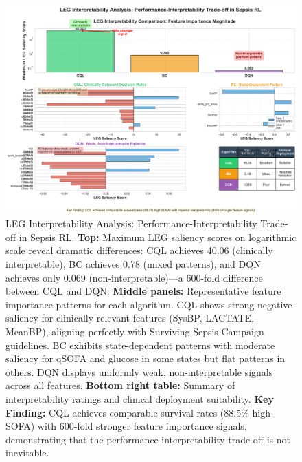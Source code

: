 \begin{figure}[htbp]
\centering
\includegraphics[width=\textwidth]{../results/figures/leg_interpretability_comparison.png}
\caption{LEG Interpretability Analysis: Performance-Interpretability Trade-off in Sepsis RL. \textbf{Top:} Maximum LEG saliency scores on logarithmic scale reveal dramatic differences: CQL achieves 40.06 (clinically interpretable), BC achieves 0.78 (mixed patterns), and DQN achieves only 0.069 (non-interpretable)—a 600-fold difference between CQL and DQN. \textbf{Middle panels:} Representative feature importance patterns for each algorithm. CQL shows strong negative saliency for clinically relevant features (SysBP, LACTATE, MeanBP), aligning perfectly with Surviving Sepsis Campaign guidelines. BC exhibits state-dependent patterns with moderate saliency for qSOFA and glucose in some states but flat patterns in others. DQN displays uniformly weak, non-interpretable signals across all features. \textbf{Bottom right table:} Summary of interpretability ratings and clinical deployment suitability. \textbf{Key Finding:} CQL achieves comparable survival rates (88.5\% high-SOFA) with 600-fold stronger feature importance signals, demonstrating that the performance-interpretability trade-off is not inevitable.}
\label{fig:leg-comparison}
\end{figure}

